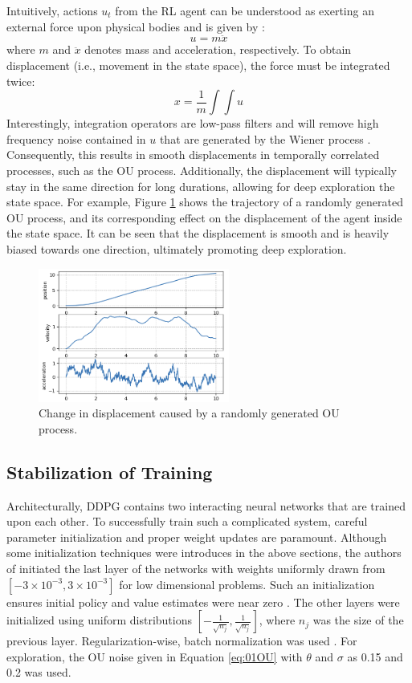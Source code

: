 Intuitively, actions $u_t$ from the RL agent can be understood as exerting an external force upon physical bodies and is given by \cite{physics}:
\begin{equation}
    u = m \ddot{x}
\end{equation}
where $m$ and  $\ddot{x}$ denotes mass and acceleration, respectively.  To obtain displacement (i.e., movement in the state space), the force must be integrated twice:
\begin{equation}
    x = \frac{1}{m}\int \int u
\end{equation}
Interestingly, integration operators are low-pass filters and will remove high frequency noise contained in $u$ that are generated by the Wiener process \cite{process_control_ref13}. Consequently, this results in smooth displacements in temporally correlated processes, such as the OU process.  Additionally, the displacement will typically stay in the same direction for long durations, allowing for deep exploration the state space. For example, Figure \ref{fig:01OU} shows the trajectory of a randomly generated OU process, and its corresponding effect on the displacement of the agent inside the state space.  It can be seen that the displacement is smooth and is heavily biased towards one direction, ultimately promoting deep exploration.

\begin{figure}[H]
    \centering
    \includegraphics[width=0.56\textwidth]{images/ch1/01OU.jpeg}
    \caption{Change in displacement caused by a randomly generated OU process.}
    \label{fig:01OU}
\end{figure}   


\subsection{Stabilization of Training}
Architecturally, DDPG contains two interacting neural networks that are trained upon each other.  To successfully train such a complicated system, careful parameter initialization and proper weight updates are paramount.  Although some initialization techniques were introduces in the above sections, the authors of \cite{ddpg} initiated the last layer of the networks with weights uniformly drawn from $[-3 \times 10^{-3}, 3 \times 10^{-3}]$ for low dimensional problems. Such an initialization ensures initial policy and value estimates were near zero \cite{ddpg}. The other layers were initialized using uniform distributions $[-\frac{1}{\sqrt{n_j}}, \frac{1}{\sqrt{n_j}}]$, where $n_j$ was the size of the previous layer.  Regularization-wise, batch normalization was used \cite{batch_norm}. For exploration, the OU noise given in Equation \ref{eq:01OU} with $\theta$ and $\sigma$ as 0.15 and 0.2 was used.

